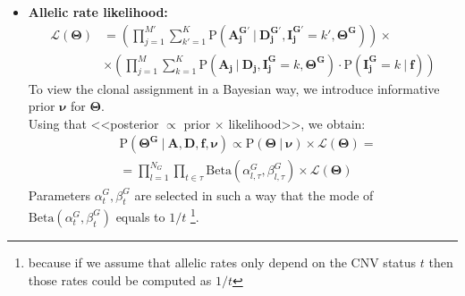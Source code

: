 \documentclass[11pt,a4paper,fullpage]{article}
\def\P{\mathrm{P}}
\theoremstyle{definition}
\theoremstyle{definition}
\theoremstyle{definition}
\numberwithin{equation}{section}
\begin{document}
\begin{itemize}
		\item \textbf{Allelic rate likelihood:} 
		\begin{equation}
		\begin{aligned}
		\mathcal{L}(\mathbf{\Theta}) &= \left (\prod_{j=1}^{M'} \sum_{k'=1}^{K}  \P(\mathbf{A^{G'}_{j}}\ |\ \mathbf{D^{G'}_{j}}, \mathbf{I^{G'}_{j}} = k', \mathbf{\Theta^{G}}) \right ) \times\\
		&\times \left (\prod_{j=1}^{M} \sum_{k=1}^{K}  \P(\mathbf{A_{j}}\ |\ \mathbf{D_{j}}, \mathbf{I^{G}_{j}} = k, \mathbf{\Theta^{G}}) \cdot \P(\mathbf{I^{G}_{j}} = k\ |\ \mathbf{f}) \right ) 
		\end{aligned}
		\end{equation}
		To view the clonal assignment in a Bayesian way, we introduce informative prior $ \mathbf{\nu} $ for $\mathbf{\Theta}$.\\ 
		Using that <<posterior $ \propto $ prior $\times$ likelihood>>, we obtain:
		\begin{equation}
		\begin{aligned}
		&\P(\mathbf{\Theta^{G}}\ |\ \mathbf{A}, \mathbf{D}, \mathbf{f}, \mathbf{\nu}) \propto \P(\mathbf{\Theta}\ |\ \mathbf{\nu}) \times \mathcal{L}(\mathbf{\Theta}) =\\
		&= \prod_{l=1}^{N_{G}} \prod_{t\in\tau} \mathrm{Beta}(\alpha_{l,\tau}^{G}, \beta_{l,\tau}^{G}) \times \mathcal{L}(\mathbf{\Theta})
		\end{aligned}
		\end{equation}
		Parameters $\alpha^{G}_{t}, \beta^{G}_{t}$ are selected in such a way that the mode of $\mathrm{Beta}(\alpha^{G}_{t}, \beta^{G}_{t})$ equals to $ 1 / t $ \footnote{because if we assume that allelic rates only depend on the CNV status $ t $ then those rates could be computed as $ 1 / t $}.
	\end{itemize}
\end{document}
